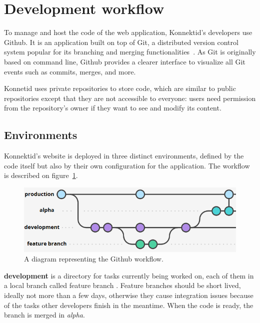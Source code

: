 \section{Development workflow}
\label{sec:github}

To manage and host the code of the web application, Konnektid's developers use Github. It is an application built on top of Git, a distributed version control system popular for its branching and merging functionalities~\cite{git}. As Git is originally based on command line, Github provides a clearer interface to visualize all Git events such as commits, merges, and more. 

Konnetid uses private repositories to store code, which are similar to public repositories except that they are not accessible to everyone: users need permission from the repository's owner if they want to see and modify its content.

\subsection{Environments}
\label{ssec:env}

Konnektid's website is deployed in three distinct environments, defined by the code itself but also by their own configuration for the application. The workflow is described on {\sc figure}~\ref{fig:githubFlow}.

\begin{figure}[h]
    \centering
    \includegraphics[scale=0.9]{figure/githubFlow.png}
    \caption{A diagram representing the Github workflow.}
    \label{fig:githubFlow}
\end{figure}

\textbf{development} is a directory for tasks currently being worked on, each of them in a local branch called \guillemotleft{} feature branch \guillemotright{}. Feature branches should be short lived, ideally not more than a few days, otherwise they cause integration issues because of the tasks other developers finish in the meantime. When the code is ready, the branch is merged in \textit{alpha}. 

